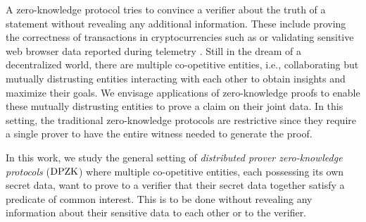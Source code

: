 A zero-knowledge protocol tries to convince a verifier about the truth of a
statement without revealing any additional information. %
These include proving the correctness of
transactions in cryptocurrencies such as \cite{zerocash} or validating sensitive web browser data reported during
telemetry \cite{prio, MozillaPrio}. Still in the dream of a decentralized world, there are
multiple co-opetitive entities, i.e.,
collaborating but mutually distrusting entities interacting with each other to obtain insights
and maximize their goals. We envisage applications of zero-knowledge
proofs to enable these mutually
distrusting entities to prove a claim on their joint data. In this setting, the traditional zero-knowledge protocols are restrictive since they require
a single prover to have the entire witness needed to generate the proof. 

In this work, we study the general setting of \textit{distributed prover
	zero-knowledge protocols} ($\text{DPZK}$) where multiple co-opetitive entities, each possessing its own secret data, want to prove to a verifier that their secret data together satisfy a predicate of common interest. This is to be done without revealing any information
about their sensitive data to each other or to the verifier. 

